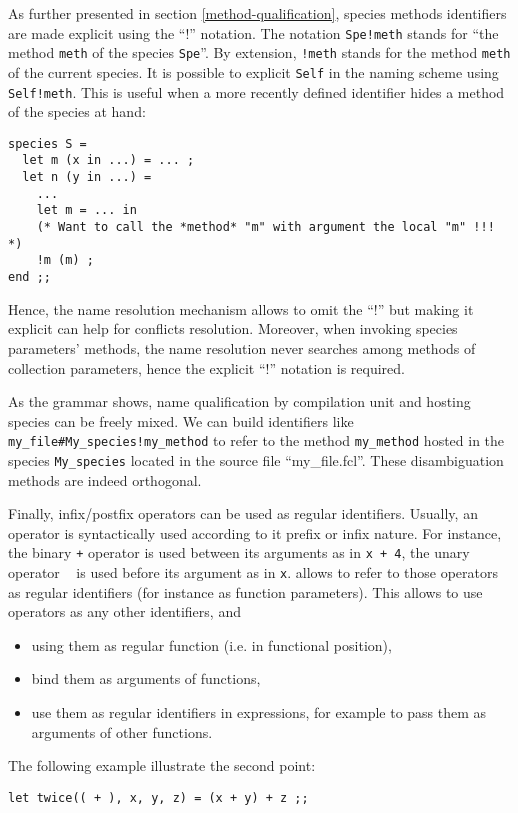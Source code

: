 \medskip {} As further presented in section
\ref{method-qualification}, species methods identifiers are made
explicit using the ``!'' notation. The notation {\tt Spe!meth} stands
for ``the method {\tt meth} of the species {\tt Spe}''. By extension,
{\tt !meth} stands for the method {\tt meth} of the current
species. It is possible to explicit {\tt Self} in the naming scheme
using {\tt Self!meth}. This is useful when a more recently defined
identifier hides a method of the species at hand: {\scriptsize
\begin{lstlisting}
species S =
  let m (x in ...) = ... ;
  let n (y in ...) =
    ...
    let m = ... in
    (* Want to call the *method* "m" with argument the local "m" !!! *)
    !m (m) ;
end ;;
\end{lstlisting}
}

Hence, the name resolution mechanism allows to omit the ``!'' but
making it explicit can help for conflicts resolution. Moreover, when
invoking species parameters' methods, the name resolution never
searches among methods of collection parameters, hence the explicit ``!''
notation is required.

As the grammar shows, name qualification by compilation unit and
hosting species can be freely mixed. We can build identifiers like
{\tt my\_file\#My\_species!my\_method} to refer to the method
{\tt my\_method} hosted in the species {\tt My\_species} located in
the {\focal} source file ``my\_file.fcl''. These disambiguation
methods are indeed orthogonal.



\medskip
{}

Finally, infix/postfix operators can be used as regular
identifiers. Usually, an operator is syntactically used according to
it prefix or infix nature. For instance, the binary {\tt +} operator
is used between its arguments as in {\tt x + 4}, the unary operator {\tt
  \tilde} is used before its argument as in {\tt \tilde x}. {\focal} allows to
refer to those operators as regular identifiers (for instance as function
parameters).
This allows to use operators as any other identifiers, and
\begin{itemize}
  \item using them as regular function (i.e. in functional position),
  \item bind them as arguments of functions,
  \item use them as regular identifiers in expressions, for example to
    pass them as arguments of other functions.
\end{itemize}
The following example illustrate the second point:
\begin{lstlisting}
let twice(( + ), x, y, z) = (x + y) + z ;;
\end{lstlisting}

